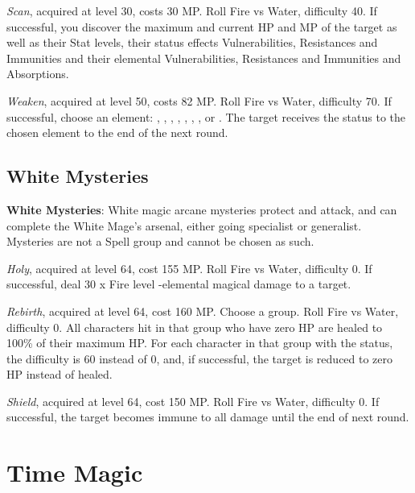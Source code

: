 \begin{multicols}{2}
    \textit{Scan}, acquired at level 30, costs 30 MP\@. Roll Fire vs Water, difficulty 40. If successful, you discover the maximum and current HP and MP of the target as well as their Stat levels, their status effects Vulnerabilities, Resistances and Immunities and their elemental Vulnerabilities, Resistances and Immunities and Absorptions.

    \textit{Weaken}, acquired at level 50, costs 82 MP\@. Roll Fire vs Water, difficulty 70. If successful, choose an element: , , , , , , ,  or . The target receives the status  to the chosen element to the end of the next round. 

    \subsection{White Mysteries}\label{subsec:white-mysteries}

    \textbf{White Mysteries}: White magic arcane mysteries protect and attack, and can complete the White Mage's arsenal, either going specialist or generalist. Mysteries are not a Spell group and cannot be chosen as such.

    \textit{Holy}, acquired at level 64, cost 155 MP\@. Roll Fire vs Water, difficulty 0. If successful, deal 30 x Fire level -elemental magical damage to a target.  

    \textit{Rebirth}, acquired at level 64, cost 160 MP\@. Choose a group. Roll Fire vs Water, difficulty 0. All characters hit in that group who have zero HP are healed to 100\% of their maximum HP\@. For each character in that group with the  status, the difficulty is 60 instead of 0, and, if successful, the target is reduced to zero HP instead of healed.

    \textit{Shield}, acquired at level 64, cost 150 MP\@. Roll Fire vs Water, difficulty 0. If successful, the target becomes immune to all damage until the end of next round.


\end{multicols}

\section{Time Magic}\label{sec:magic-time}


